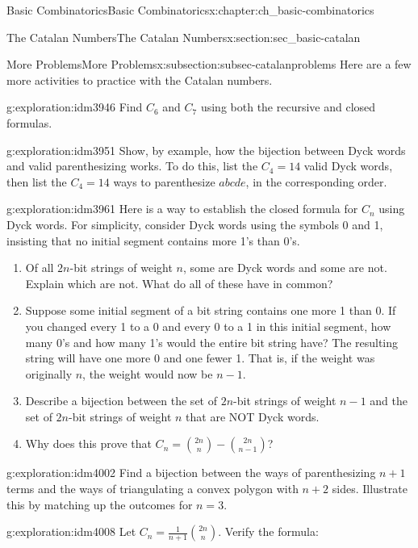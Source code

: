 \documentclass[oneside,10pt,]{book}
\numberwithin{equation}{chapter}
\begin{document}
\begin{chapterptx}{Basic Combinatorics}{}{Basic Combinatorics}{}{}{x:chapter:ch_basic-combinatorics}
\begin{sectionptx}{The Catalan Numbers}{}{The Catalan Numbers}{}{}{x:section:sec_basic-catalan}
\begin{subsectionptx}{More Problems}{}{More Problems}{}{}{x:subsection:subsec-catalanproblems}
Here are a few more activities to practice with the Catalan numbers.%
\begin{exploration}{}{g:exploration:idm3946}%
Find \(C_6\) and \(C_7\) using both the recursive and closed formulas.%
\end{exploration}
\begin{exploration}{}{g:exploration:idm3951}%
Show, by example, how the bijection between Dyck words and valid parenthesizing works.  To do this, list the \(C_4 = 14\) valid Dyck words, then list the \(C_4 = 14\) ways to parenthesize \(abcde\), in the corresponding order.%
\end{exploration}
\begin{exploration}{}{g:exploration:idm3961}%
Here is a way to establish the closed formula for \(C_n\) using Dyck words.  For simplicity, consider Dyck words using the symbols 0 and 1, insisting that no initial segment contains more 1's than 0's.%
\begin{enumerate}[font=\bfseries,label=(\alph*),ref=\alph*]
\item{}Of all \(2n\)-bit strings of weight \(n\), some are Dyck words and some are not.  Explain which are not.  What do all of these have in common?%
\item{}Suppose some initial segment of a bit string contains one more 1 than 0.  If you changed every 1 to a 0 and every 0 to a 1 in this initial segment, how many 0's and how many 1's would the entire bit string have?%
The resulting string will have one more 0 and one fewer 1.  That is, if the weight was originally \(n\), the weight would now be \(n-1\).%
\item{}Describe a bijection between the set of \(2n\)-bit strings of weight \(n-1\) and the set of \(2n\)-bit strings of weight \(n\) that are NOT Dyck words.%
\item{}Why does this prove that \(C_n = \binom{2n}{n} - \binom{2n}{n-1}\)?%
\end{enumerate}
\end{exploration}
\begin{exploration}{}{g:exploration:idm4002}%
Find a bijection between the ways of parenthesizing \(n+1\) terms and the ways of triangulating a convex polygon with \(n+2\) sides.  Illustrate this by matching up the outcomes for \(n = 3\).%
\end{exploration}
\begin{exploration}{}{g:exploration:idm4008}%
Let \(C_{n} = \frac{1}{n + 1}\binom{2n}{n}\). Verify the formula:%
\begin{equation*}

\end{equation*}
\end{exploration}
\end{subsectionptx}
\end{sectionptx}
\end{chapterptx}
\end{document}
